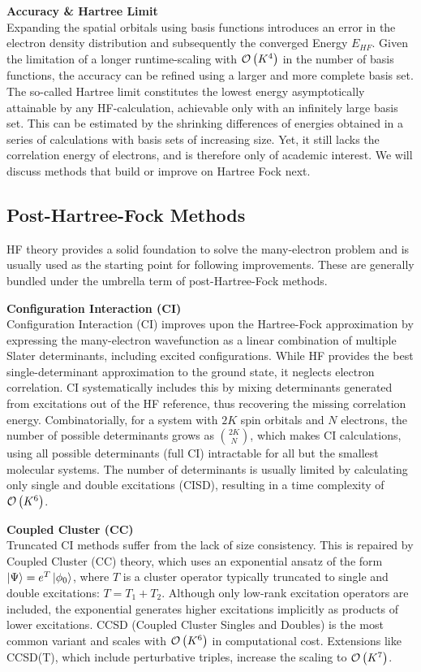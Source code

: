 \textbf{Accuracy \& Hartree Limit}\\
Expanding the spatial orbitals using basis functions introduces an error in the electron density distribution and subsequently the converged Energy $E_{HF}$. Given the limitation of a longer runtime-scaling with $\mathcal{O}\left(K^4\right)$ in the number of basis functions, the accuracy can be refined using a larger and more complete basis set. The so-called Hartree limit constitutes the lowest energy asymptotically attainable by any HF-calculation, achievable only with an infinitely large basis set. This can be estimated by the shrinking differences of energies obtained in a series of calculations with basis sets of increasing size. \parencite{ref:Jensen2005hf} Yet, it still lacks the correlation energy of electrons, and is therefore only of academic interest. We will discuss methods that build or improve on Hartree Fock next. 

\subsection{Post-Hartree-Fock Methods}
\label{subsec:background_post_hf}
HF theory provides a solid foundation to solve the many-electron problem and is usually used as the starting point for following improvements. These are generally bundled under the umbrella term of post-Hartree-Fock methods.

\textbf{Configuration Interaction (CI)}\\
Configuration Interaction (CI) improves upon the Hartree-Fock approximation by expressing the many-electron wavefunction as a linear combination of multiple Slater determinants, including excited configurations. While HF provides the best single-determinant approximation to the ground state, it neglects electron correlation. CI systematically includes this by mixing determinants generated from excitations out of the HF reference, thus recovering the missing correlation energy. Combinatorially, for a system with $2K$ spin orbitals and $N$ electrons, the number of possible determinants grows as $\binom{2K}{N}$, which makes CI calculations, using all possible determinants (full CI) intractable for all but the smallest molecular systems. The number of determinants is usually limited by calculating only single and double excitations (CISD), resulting in a time complexity of $\mathcal{O}\left(K^6\right)$.

\textbf{Coupled Cluster (CC)}\\
Truncated CI methods suffer from the lack of size consistency. This is repaired by Coupled Cluster (CC) theory, which uses an exponential ansatz of the form $\ket{\Psi} = e^T \ket{\phi_0}$, where $T$ is a cluster operator typically truncated to single and double excitations: $T = T_1 + T_2$. Although only low-rank excitation operators are included, the exponential generates higher excitations implicitly as products of lower excitations. CCSD (Coupled Cluster Singles and Doubles) is the most common variant and scales with $\mathcal{O}\left(K^6\right)$ in computational cost. Extensions like CCSD(T), which include perturbative triples, increase the scaling to $\mathcal{O}\left(K^7\right)$.

